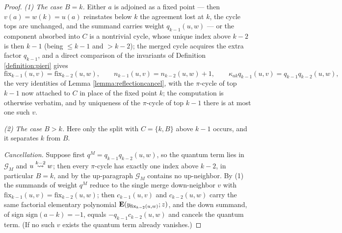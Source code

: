 \documentclass{amsart}
\theoremstyle{definition}
\theoremstyle{remark}
\numberwithin{equation}{section}
\newcommand{\xrightsquigarrow}[2][]{%
	\mathrel{\mathop{\rightsquigarrow}\limits^{\scriptstyle #2}%
	\ifx\hfuzz#1\hfuzz\else_{\scriptstyle #1}\fi}%
}
\newcommand{\tom}[1]{\ensuremath{\xrightsquigarrow{#1}}}
\newcommand{\fx}{\mathrm{fix}}
\begin{document}
\begin{proof}
\emph{(1) The case $B=k$.} Either $a$ is adjoined as a fixed point --- then $v(a)=w(k)=u(a)$ reinstates below $k$ the agreement lost at $k$, the cycle tops are unchanged, and the summand carries weight $q_{k-1}(u,w)$ --- or the component absorbed into $C$ is a nontrivial cycle, whose unique index above $k-2$ is then $k-1$ (being $\leq k-1$ and $>k-2$); the merged cycle acquires the extra factor $q_{k-1}$, and a direct comparison of the invariants of Definition \ref{definition:pieri} gives
$$\fx_{{k-1}}(u,v)=\fx_{{k-2}}(u,w),\qquad n_{k-1}(u,v)=n_{k-2}(u,w)+1,\qquad \kappa_{ak}q_{k-1}(u,v)=q_{k-1}q_{k-2}(u,w),$$
the very identities of Lemma \ref{lemma:reflectioncancel}, with the $\pi$-cycle of top $k-1$ now attached to $C$ in place of the fixed point $k$; the computation is otherwise verbatim, and by uniqueness of the $\pi$-cycle of top $k-1$ there is at most one such $v$.

\emph{(2) The case $B>k$.} Here only the split with $C=\{k,B\}$ above $k-1$ occurs, and it separates $k$ from $B$.

\emph{Cancellation.} Suppose first $q^M=q_{k-1}q_{k-2}(u,w)$, so the quantum term lies in $\mathcal{G}_M$ and $u\tom{k-2}w$; then every $\pi$-cycle has exactly one index above $k-2$, in particular $B=k$, and by the up-paragraph $\mathcal{G}_M$ contains no up-neighbor. By (1) the summands of weight $q^M$ reduce to the single merge down-neighbor $v$ with $\fx_{{k-1}}(u,v)=\fx_{{k-2}}(u,w)$; then $c_{k-1}(u,v)$ and $c_{k-2}(u,w)$ carry the same factorial elementary polynomial $\wte(y_{\fx_{{k-2}}(u,w)};z)$, and the down summand, of sign $\mathrm{sign}(a-k)=-1$, equals $-q_{k-1}c_{k-2}(u,w)$ and cancels the quantum term. (If no such $v$ exists the quantum term already vanishes.)


\end{proof}
\end{document}
